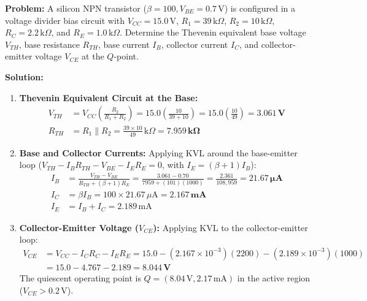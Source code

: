 \begin{examplebox}
\textbf{Problem:} A silicon NPN transistor ($\beta = 100, V_{BE} = 0.7\,\text{V}$) is configured in a voltage divider bias circuit with $V_{CC} = 15.0\,\text{V}$, $R_1 = 39\,\text{k}\Omega$, $R_2 = 10\,\text{k}\Omega$, $R_C = 2.2\,\text{k}\Omega$, and $R_E = 1.0\,\text{k}\Omega$.
Determine the Thevenin equivalent base voltage $V_{TH}$, base resistance $R_{TH}$, base current $I_B$, collector current $I_C$, and collector-emitter voltage $V_{CE}$ at the $Q$-point.

\textbf{Solution:}
\begin{enumerate}
    \item \textbf{Thevenin Equivalent Circuit at the Base:}
    \begin{align}
        V_{TH} &= V_{CC}\left(\frac{R_2}{R_1 + R_2}\right) = 15.0\left(\frac{10}{39 + 10}\right) = 15.0\left(\frac{10}{49}\right) = \mathbf{3.061\,\text{V}} \\
        R_{TH} &= R_1 \parallel R_2 = \frac{39 \times 10}{49}\,\text{k}\Omega = \mathbf{7.959\,\text{k}\Omega}
    \end{align}
    \item \textbf{Base and Collector Currents:}
    Applying KVL around the base-emitter loop ($V_{TH} - I_B R_{TH} - V_{BE} - I_E R_E = 0$, with $I_E = (\beta+1)I_B$):
    \begin{align}
        I_B &= \frac{V_{TH} - V_{BE}}{R_{TH} + (\beta + 1)R_E} = \frac{3.061 - 0.70}{7959 + (101)(1000)} = \frac{2.361}{108{,}959} = \mathbf{21.67\,\mu\text{A}} \\
        I_C &= \beta I_B = 100 \times 21.67\,\mu\text{A} = \mathbf{2.167\,\text{mA}} \\
        I_E &= I_B + I_C = 2.189\,\text{mA}
    \end{align}
    \item \textbf{Collector-Emitter Voltage ($V_{CE}$):}
    Applying KVL to the collector-emitter loop:
    \begin{align}
        V_{CE} &= V_{CC} - I_C R_C - I_E R_E = 15.0 - (2.167 \times 10^{-3})(2200) - (2.189 \times 10^{-3})(1000) \\
        &= 15.0 - 4.767 - 2.189 = \mathbf{8.044\,\text{V}}
    \end{align}
    The quiescent operating point is $Q = (8.04\,\text{V}, 2.17\,\text{mA})$ in the active region ($V_{CE} > 0.2\,\text{V}$).
\end{enumerate}
\end{examplebox}

